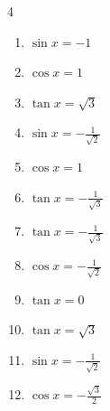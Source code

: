 \begin{multicols}{4}
\begin{enumerate}
  \item $\displaystyle \sin{x}  = -1$


  \item $\displaystyle \cos{x}  = 1$

        \phantom{$\displaystyle x = 0$}

  \item $\displaystyle \tan{x}  = \sqrt{3}$


  \item $\displaystyle \sin{x}  = -\frac{1}{\sqrt{2}}$


  \item $\displaystyle \cos{x}  = 1$

        \phantom{$\displaystyle x = 0$}

  \item $\displaystyle \tan{x}  = -\frac{1}{\sqrt{3}}$


  \item $\displaystyle \tan{x}  = -\frac{1}{\sqrt{3}}$


\columnbreak %

  \item $\displaystyle \cos{x}  = -\frac{1}{\sqrt{2}}$


  \item $\displaystyle \tan{x}  = 0$

        \phantom{$\displaystyle x = 0 , \pi$}

  \item $\displaystyle \tan{x}  = \sqrt{3}$


  \item $\displaystyle \sin{x}  = -\frac{1}{\sqrt{2}}$


  \item $\displaystyle \cos{x}  = -\frac{\sqrt{3}}{2}$


\end{enumerate}
\end{multicols}
